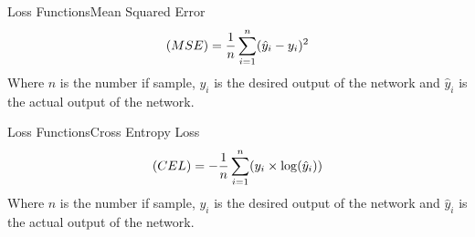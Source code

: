 \documentclass{beamer}
\begin{document}
\begin{frame}{Loss Functions}{Mean Squared Error}
    \begin{equation}
        \text(MSE) = \frac{1}{n}\sum_{i=1}^{n}(\hat{y}_i-y_i)^2
    \end{equation}
    Where $n$ is the number if sample, $y_i$ is the desired output of the network and $\hat{y}_i$ is the actual output of the network.
\end{frame}

\begin{frame}{Loss Functions}{Cross Entropy Loss}
    \begin{equation}
        \text(CEL) = -\frac{1}{n}\sum_{i=1}^{n}(y_i\times\log(\hat{y}_i))
    \end{equation}
    Where $n$ is the number if sample, $y_i$ is the desired output of the network and $\hat{y}_i$ is the actual output of the network.
\end{frame}
\end{document}
